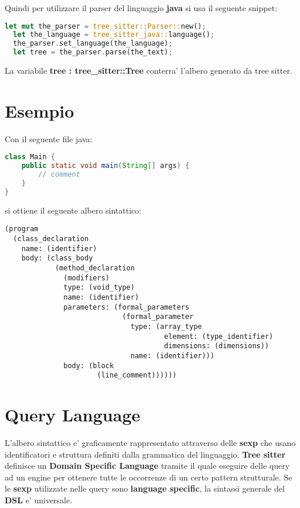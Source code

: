 Quindi per utilizzare il parser del linguaggio \textbf{java} si usa il seguente snippet:

\begin{lstlisting}[language=Rust]
  let mut the_parser = tree_sitter::Parser::new();
  let the_language = tree_sitter_java::language();
  the_parser.set_language(the_language);
  let tree = the_parser.parse(the_text);
\end{lstlisting}

La variabile \textbf{tree : tree\_sitter::Tree} conterra' l'albero generato da tree sitter.


\section{Esempio}

Con il seguente file java:

\begin{lstlisting}[language=Java]
class Main {
	public static void main(String[] args) {
    	// comment
    }
}
\end{lstlisting}

si ottiene il seguente albero sintattico:

\begin{lstlisting}
(program
  (class_declaration
    name: (identifier)
    body: (class_body
            (method_declaration
              (modifiers)
              type: (void_type)
              name: (identifier)
              parameters: (formal_parameters
                            (formal_parameter
                              type: (array_type
                                      element: (type_identifier)
                                      dimensions: (dimensions))
                              name: (identifier)))
              body: (block
                      (line_comment))))))
\end{lstlisting}

\section{Query Language}

L'albero sintattico e' graficamente rappresentato attraverso delle \textbf{sexp} che usano identificatori e struttura definiti dalla grammatica del linguaggio.
\textbf{Tree sitter} definisce un \textbf{Domain Specific Language} \cite{TreeSitterQuerySyntax} tramite il quale eseguire delle query ad un engine per ottenere tutte le occorrenze di un certo pattern strutturale.
Se le \textbf{sexp} utilizzate nelle query sono \textbf{language specific}, la sintassi generale del \textbf{DSL} e' universale.

